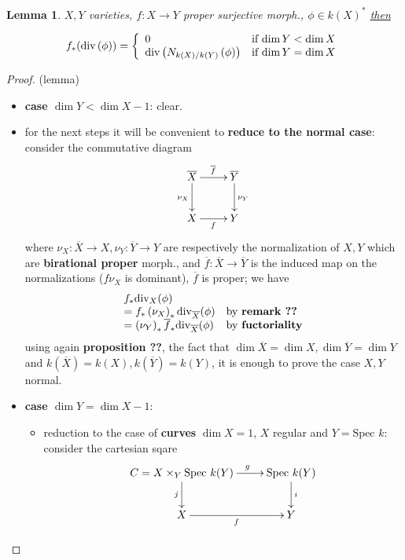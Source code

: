 \documentclass[oneside,a4paper,11pt]{amsbook}
\theoremstyle{pl}
\newtheorem{lem}{Lemma}[chapter]
\theoremstyle{df}
\theoremstyle{rm}
\newcommand{\pa}[1]{
\left(#1\right)
}
\newcommand{\ol}[1]{
\overline{#1}
}
\newcommand{\ul}[1]{
\underline{#1}
}
\newcommand{\spc}[1]{
\text{Spec }#1
}
\newcommand{\dv}[1]{
\text{div}\pa{#1}
}
\begin{document}
\begin{lem}
$X,Y$ varieties, $f:X\rightarrow Y$ proper surjective morph., $\phi\in k(X)^*$ \ul{then}
\[
f_*(\dv{\phi})=\left\{
\begin{array}{l l}
0 &\text{if $\dim Y<\dim X$}\\
\dv{N_{k(X)/k(Y)}\pa{\phi}} &\text{if $\dim Y=\dim X$}\\
\end{array}
\right.
\]
\end{lem}

\begin{proof}(lemma)
\begin{itemize}
\item{\textbf{case $\dim Y<\dim X-1$}: clear.}
\item{for the next steps it will be convenient to \textbf{reduce to the normal case}: consider the commutative diagram
\[
\xymatrix{
\ol{X}\ar[r]^{\ol{f}}\ar[d]_{\nu_X} &\ol{Y}\ar[d]^{\nu_Y}\\
X\ar[r]_f &Y\\
}
\]
where $\nu_X:\ol{X}\rightarrow X,\nu_Y:\ol{Y}\rightarrow Y$ are respectively the normalization of $X,Y$ which are \textbf{birational proper} morph., and $\ol{f}:\ol{X}\rightarrow\ol{Y}$ is the induced map on the normalizations ($f\nu_X$ is dominant), $\ol{f}$ is proper; we have
\[
\begin{array}{l l}
f_*\text{div}_X(\phi) &\\
=f_*\pa{\nu_X}_*\text{div}_{\ol{X}}(\phi) &\text{by \textbf{remark ??}}\\
=\pa{\nu_Y}_*\ol{f}_*\text{div}_{\ol{X}}(\phi) &\text{by \textbf{fuctoriality}}\\
\end{array}
\]
using again \textbf{proposition ??}, the fact that $\dim\ol{X}=\dim X,\dim\ol{Y}=\dim Y$ and $k(\ol{X})=k(X),k(\ol{Y})=k(Y)$, it is enough to prove the case $X,Y$ normal.}
\item{\textbf{case $\dim Y=\dim X-1$}: 
\begin{itemize}
\item{reduction to the case of \textbf{curves} $\dim X=1$, $X$ regular and $Y=\spc k$: consider the cartesian sqare
\[
\xymatrix{
C=X\times_Y\spc k(Y)\ar[r]^(0.60)g\ar[d]_j &\spc k(Y)\ar[d]^i\\
X\ar[r]_f &Y\\
}\]}
\end{itemize}}
\end{itemize}
\end{proof}
\end{document}
